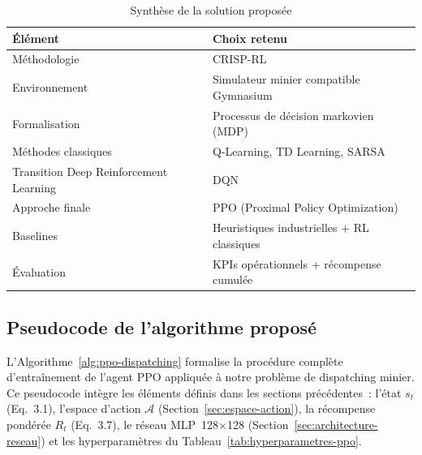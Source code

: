 \documentclass[11pt,a4paper]{report}
\begin{document}
\begin{table}[H]
\centering
\caption{Synthèse de la solution proposée}
\label{tab:synthese-solution}
\begin{tabular}{lp{9cm}}
\toprule
\textbf{Élément} & \textbf{Choix retenu} \\
\midrule
Méthodologie & CRISP-RL \\
Environnement & Simulateur minier compatible Gymnasium \\
Formalisation & Processus de décision markovien (MDP) \\
Méthodes classiques & Q-Learning, TD Learning, SARSA \\
Transition Deep Reinforcement Learning & DQN \\
Approche finale & PPO (Proximal Policy Optimization) \\
Baselines & Heuristiques industrielles + RL classiques \\
Évaluation & KPIs opérationnels + récompense cumulée \\
\bottomrule
\end{tabular}
\end{table}

\subsection{Pseudocode de l'algorithme proposé}
\label{sec:pseudocode}

L'Algorithme~\ref{alg:ppo-dispatching} formalise la procédure complète d'entraînement de l'agent PPO appliquée à notre problème de dispatching minier. Ce pseudocode intègre les éléments définis dans les sections précédentes~: l'état $s_t$ (Eq.~3.1), l'espace d'action $\mathcal{A}$ (Section~\ref{sec:espace-action}), la récompense pondérée $R_t$ (Eq.~3.7), le réseau MLP~128$\times$128 (Section~\ref{sec:architecture-reseau}) et les hyperparamètres du Tableau~\ref{tab:hyperparametres-ppo}.
\end{document}
